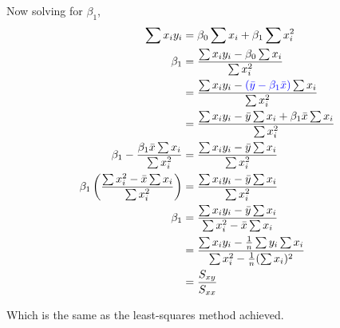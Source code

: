 Now solving for $\beta_1$, 
\begin{align*}
    \sum x_i y_i &= \beta_0 \sum x_i + \beta_1 \sum x_i^2\\
    \beta_1 &= \frac{\sum x_i y_i - \beta_0 \sum x_i }{ \sum x_i^2} \\
    &= \frac{\sum x_i y_i -  \blue{\pars{ \ybar - \beta_1 \xbar}} \sum x_i }{ \sum x_i^2}\\
    &=  \frac{\sum x_i y_i -  \ybar \sum x_i + \beta_1 \xbar \sum x_i }{ \sum x_i^2}\\
    \beta_1 - \frac{\beta_1 \xbar \sum x_i}{ \sum x_i^2} &= \frac{\sum x_i y_i -  \ybar \sum x_i}{ \sum x_i^2}\\
    \beta_1 \pars{ \frac{\sum x_i^2 - \xbar \sum x_i}{\sum x_i^2} } &= \frac{\sum x_i y_i -  \ybar \sum x_i}{ \sum x_i^2}\\
    \beta_1 &= \frac{\sum x_i y_i -  \ybar \sum x_i}{ \sum x_i^2 - \xbar \sum x_i}\\
    &= \frac{\sum x_i y_i - \over{n} \sum y_i \sum x_i}{ \sum x_i^2 - \over{n} (\sum x_i)^2}\\
    &= \frac{S_{xy}}{S_{xx}}
\end{align*}

\nnl Which is the same as the least-squares method achieved.